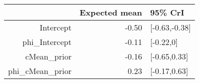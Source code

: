 \begin{tabular}{rrl}
  \hline
 & Expected mean & 95\% CrI \\ 
  \hline
Intercept & -0.50 & [-0.63,-0.38] \\ 
  phi\_Intercept & -0.11 & [-0.22,0] \\ 
  cMean\_prior & -0.16 & [-0.65,0.33] \\ 
  phi\_cMean\_prior & 0.23 & [-0.17,0.63] \\ 
   \hline
\end{tabular}

